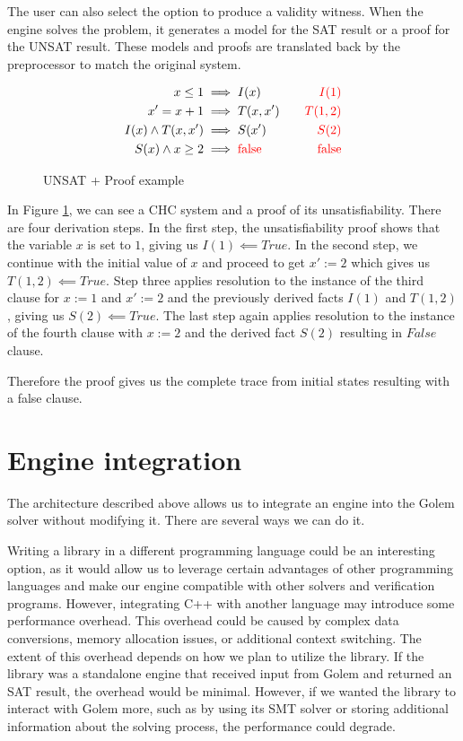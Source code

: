The user can also select the option to produce a validity witness. When the engine solves the problem, it generates a model for the SAT result or a proof for the UNSAT result. These models and proofs are translated back by the preprocessor to match the original system.

\begin{figure}[H]
\begin{align*}
    x \leq 1 &\implies I(x) \quad &\text{\color{red}{\(I(1)\)}} \\
    x' = x + 1 &\implies T(x, x') \quad &\text{\color{red}{\(T(1, 2)\)}} \\
    I(x) \land T(x, x') &\implies S(x') \quad &\text{\color{red}{\(S(2)\)}} \\
    S(x) \land x \geq 2 &\implies \text{\color{red}{false}} \quad &\text{\color{red}{false}}
\end{align*}
    \caption{UNSAT + Proof example}\label{ex:UNSAT}
\end{figure}

In Figure \ref{ex:UNSAT}, we can see a CHC
system and a proof of its unsatisfiability. There are four derivation steps. In
the first step, the unsatisfiability proof shows that the variable $x$ is set
to $1$, giving us $I(1) \impliedby True$. In the second step, we continue with
the initial value of $x$ and proceed to get $x' := 2$ which gives us $T(1, 2)
\impliedby True$. Step three applies resolution to the instance of the third
clause for $x := 1$ and $x' := 2$ and the previously derived facts $I(1)$ and
$T(1,2)$, giving us $S(2) \impliedby True$. The last step again applies
resolution to the instance of the fourth clause with $x := 2$ and the derived
fact $S(2)$ resulting in $False$ clause. 

Therefore the proof gives us the complete trace from initial states resulting with a false clause.


\section{Engine integration}
\noindent The architecture described above allows us to integrate an engine into the Golem solver without modifying it. There are several ways we can do it. 

Writing a library in a different programming language could be an interesting
option, as it would allow us to leverage certain advantages of other
programming languages and make our engine compatible with other solvers and
verification programs. However, integrating C++ with another language may
introduce some performance overhead. This overhead could be caused by complex
data conversions, memory allocation issues, or additional context switching.
The extent of this overhead depends on how we plan to utilize the library. If
the library was a standalone engine that received input from Golem and returned
an SAT result, the overhead would be minimal. However, if we wanted the library to
interact with Golem more, such as by using its SMT solver or storing additional
information about the solving process, the performance could degrade. 

